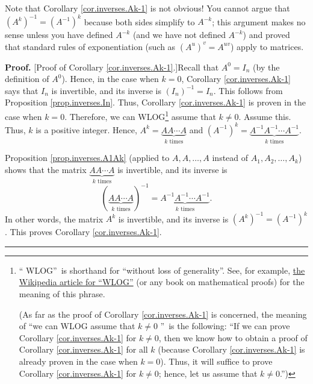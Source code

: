 \documentclass[numbers=enddot,12pt,final,onecolumn,notitlepage]{scrartcl}%
\theoremstyle{definition}
\newenvironment{proof}[1][Proof]{\noindent\textbf{#1.} }{\ \rule{0.5em}{0.5em}}
\begin{document}
Note that Corollary \ref{cor.inverses.Ak-1} is not obvious! You cannot argue
that $\left(  A^{k}\right)  ^{-1}=\left(  A^{-1}\right)  ^{k}$ because both
sides simplify to $A^{-k}$; this argument makes no sense unless you have
defined $A^{-k}$ (and we have not defined $A^{-k}$) and proved that standard
rules of exponentiation (such as $\left(  A^{u}\right)  ^{v}=A^{uv}$) apply to matrices.

\begin{proof}
[Proof of Corollary \ref{cor.inverses.Ak-1}.]Recall that $A^{0}=I_{n}$ (by the
definition of $A^{0}$). Hence, in the case when $k=0$, Corollary
\ref{cor.inverses.Ak-1} says that $I_{n}$ is invertible, and its inverse is
$\left(  I_{n}\right)  ^{-1}=I_{n}$. This follows from Proposition
\ref{prop.inverses.In}. Thus, Corollary \ref{cor.inverses.Ak-1} is proven in
the case when $k=0$. Therefore, we can WLOG\footnote{\textquotedblleft
WLOG\textquotedblright\ is shorthand for \textquotedblleft without loss of
generality\textquotedblright. See, for example,
\href{https://en.wikipedia.org/wiki/Without_loss_of_generality}{the Wikipedia
article for \textquotedblleft WLOG\textquotedblright} (or any book on
mathematical proofs) for the meaning of this phrase.
\par
(As far as the proof of Corollary \ref{cor.inverses.Ak-1} is concerned, the
meaning of \textquotedblleft we can WLOG assume that $k\neq0$%
\textquotedblright\ is the following: \textquotedblleft If we can prove
Corollary \ref{cor.inverses.Ak-1} for $k\neq0$, then we know how to obtain a
proof of Corollary \ref{cor.inverses.Ak-1} for all $k$ (because Corollary
\ref{cor.inverses.Ak-1} is already proven in the case when $k=0$). Thus, it
will suffice to prove Corollary \ref{cor.inverses.Ak-1} for $k\neq0$; hence,
let us assume that $k\neq0$.\textquotedblright)} assume that $k\neq0$. Assume
this. Thus, $k$ is a positive integer. Hence, $A^{k}=\underbrace{AA\cdots
A}_{k\text{ times}}$ and $\left(  A^{-1}\right)  ^{k}=\underbrace{A^{-1}%
A^{-1}\cdots A^{-1}}_{k\text{ times}}$.

Proposition \ref{prop.inverses.A1Ak} (applied to $A,A,\ldots,A$ instead of
$A_{1},A_{2},\ldots,A_{k}$) shows that the matrix $\underbrace{AA\cdots
A}_{k\text{ times}}$ is invertible, and its inverse is%
\[
\left(  \underbrace{AA\cdots A}_{k\text{ times}}\right)  ^{-1}%
=\underbrace{A^{-1}A^{-1}\cdots A^{-1}}_{k\text{ times}}.
\]
In other words, the matrix $A^{k}$ is invertible, and its inverse is $\left(
A^{k}\right)  ^{-1}=\left(  A^{-1}\right)  ^{k}$. This proves Corollary
\ref{cor.inverses.Ak-1}.
\end{proof}
\end{document}
